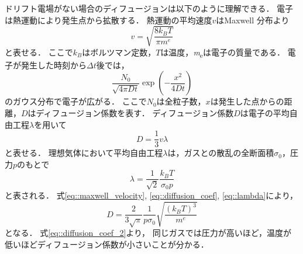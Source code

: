 \documentclass[../master]{subfiles}
\begin{document}
ドリフト電場がない場合のディフュージョンは以下のように理解できる．
電子は熱運動により発生点から拡散する．
熱運動の平均速度$v$はMaxwell 分布より
\begin{equation}
  v = \sqrt{\frac{8k_{B}T}{\pi \si{\electronmass}}}
  \label{eq::maxwell_velocity}
\end{equation}
と表せる．
ここで$k_{B}$はボルツマン定数，$T$は温度，\si{\electronmass}は電子の質量である．
電子が発生した時刻から$\Delta t$後では，
\begin{equation}
  \frac{N_0}{\sqrt{4\pi D t}}\exp\left(-\frac{x^{2}}{4 D t}\right)
  \label{eq::gaus_dist}
\end{equation}
のガウス分布で電子が広がる．
ここで$N_{0}$は全粒子数，$x$は発生した点からの距離，$D$はディフュージョン係数を表す．
ディフュージョン係数$D$は電子の平均自由工程$\lambda$を用いて
\begin{equation}
  D = \frac{1}{3}v\lambda
  \label{eq::diffusion_coef}
\end{equation}
と表せる．
理想気体において平均自由工程$\lambda$は，ガスとの散乱の全断面積$\sigma_{0}$，圧力$p$のもとで
\begin{equation}
  \lambda = \frac{1}{\sqrt{2}}\frac{k_{B}T}{\sigma_{0}p}
  \label{eq::lambda}
\end{equation}
と表される．
式\ref{eq::maxwell_velocity}, \ref{eq::diffusion_coef}, \ref{eq::lambda}により，
\begin{equation}
  D = \frac{2}{3\sqrt{\pi}}\frac{1}{p\sigma_{0}}\sqrt{\frac{\left(k_{B}T\right)^{3}}{\si{\electronmass}}}
  \label{eq::diffusion_coef_2}
\end{equation}
となる．
式\ref{eq::diffusion_coef_2}より，
同じガスでは圧力が高いほど，温度が低いほどディフュージョン係数が小さいことが分かる．
\end{document}
